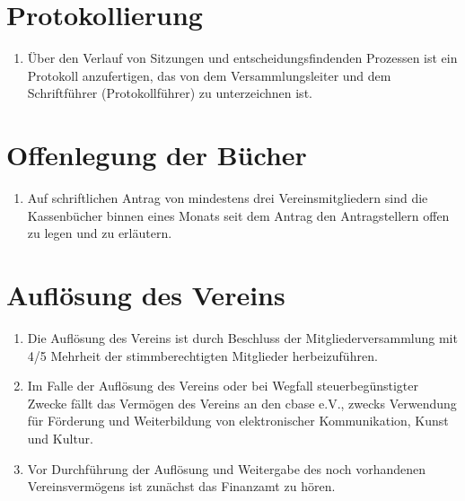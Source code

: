 \documentclass[ngerman]{scrartcl}
\begin{document}
\section{Protokollierung} \label{sec:protokollierung}
\begin{enumerate}
 \item Über den Verlauf von Sitzungen und entscheidungsfindenden
 Prozessen ist ein Protokoll anzufertigen, das von dem
 Versammlungsleiter und dem Schriftführer (Protokollführer) zu
 unterzeichnen ist.
\end{enumerate}
\section{Offenlegung der Bücher} \label{sec:offenlegung_der_buecher}
\begin{enumerate}
 \item Auf schriftlichen Antrag von mindestens drei
 Vereinsmitgliedern sind die Kassenbücher binnen eines Monats
 seit dem Antrag den Antragstellern offen zu legen und zu
 erläutern.
\end{enumerate}
\section{Auflösung des Vereins} \label{sec:aufloesung_des_vereins}
\begin{enumerate}
 \item Die Auflösung des Vereins ist durch Beschluss der
 Mitgliederversammlung mit 4/5 Mehrheit der stimmberechtigten
 Mitglieder herbeizuführen.
 \item Im Falle der Auflösung des Vereins oder bei Wegfall
 steuerbegünstigter Zwecke fällt das Vermögen des Vereins an
 den cbase e.V., zwecks Verwendung für Förderung und
 Weiterbildung von elektronischer Kommunikation, Kunst und
 Kultur.
 \item Vor Durchführung der Auflösung und Weitergabe des noch
 vorhandenen Vereinsvermögens ist zunächst das Finanzamt zu
 hören.
\end{enumerate}
\end{document}
